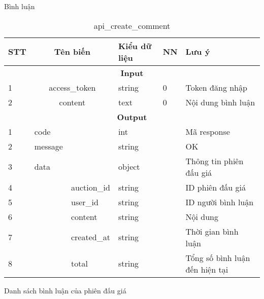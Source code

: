 \documentclass[../DoAn.tex]{subfiles}
\begin{document}
Bình luận
    \begin{longtable}{| p{} | p{} | p{} |p{} | p{}| p{} |  } 
    \caption{api\_create\_comment}
    \label{banga15}
    \endfirsthead
    \endhead
    \hline
    \bfseries STT & \multicolumn{2}{c|}{\bfseries Tên biến}& \bfseries Kiểu dữ liệu &\bfseries NN &\bfseries Lưu ý\\\hline
    \multicolumn{6}{|c|}{\bfseries Input}\\\hline
    1  & \multicolumn{2}{c|}{access\_token} & string & 0 & Token đăng nhập\\\hline
    2  & \multicolumn{2}{c|}{content} & text & 0 & Nội dung bình luận\\\hline
    \multicolumn{6}{|c|}{\bfseries Output}\\\hline
    1  & code& & int &  & Mã response\\\hline
    2  & message& & string &  & OK\\\hline
    3  & data& & object &  & Thông tin phiên đấu giá\\\cline{1-1}\cline{3-6}
    4  & \multirow{5}{*}{}    & auction\_id & string &  & ID phiên đấu giá\\\cline{1-1}\cline{3-6}
    5  &   & user\_id& string &  & ID người bình luận\\\cline{1-1}\cline{3-6}
    6  &   & content& string &  & Nội dung\\\cline{1-1}\cline{3-6}
    7  &   & created\_at& string &  & Thời gian bình luận\\\cline{1-1}\cline{3-6}
    8  &   & total& string &  & Tổng số bình luận đến hiện tại\\\hline
    \end{longtable}
\newpage
Danh sách bình luận của phiên đấu giá
    \tabletail{\hline}
    \label{banga16}
\end{document}

